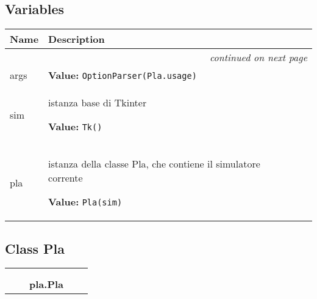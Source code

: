 
  \subsection{Variables}

    \vspace{-1cm}
\hspace{\varindent}\begin{longtable}{|p{\varnamewidth}|p{\vardescrwidth}|l}
\cline{1-2}
\cline{1-2} \centering \textbf{Name} & \centering \textbf{Description}& \\
\cline{1-2}
\endhead\cline{1-2}\multicolumn{3}{r}{\small\textit{continued on next page}}\\\endfoot\cline{1-2}
\endlastfoot\raggedright a\-r\-g\-s\- & \raggedright \textbf{Value:} 
{\tt OptionParser(Pla.usage)}&\\
\cline{1-2}
\raggedright s\-i\-m\- & \raggedright istanza base di Tkinter

\textbf{Value:} 
{\tt Tk()}&\\
\cline{1-2}
\raggedright p\-l\-a\- & \raggedright istanza della classe Pla, che contiene il simulatore corrente

\textbf{Value:} 
{\tt Pla(sim)}&\\
\cline{1-2}
\end{longtable}



\subsection{Class Pla}

    \label{pla:Pla}
\begin{tabular}{cccccc}
\multicolumn{2}{r}{\settowidth{\BCL}{object}\multirow{2}{\BCL}{object}}
&&
  \\\cline{3-3}
  &&\multicolumn{1}{c|}{}
&&
  \\
&&\multicolumn{2}{l}{\textbf{pla.Pla}}
\end{tabular}

